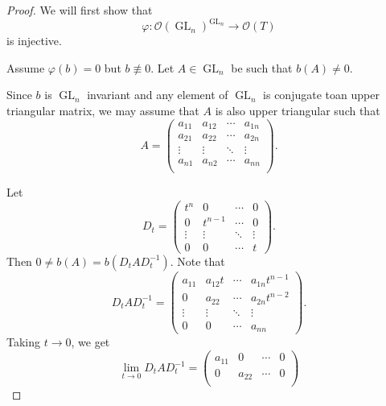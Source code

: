 \documentclass[10pt]{article}
\numberwithin{equation}{theorem}
\DeclareMathOperator{\GL}{GL}
\newcommand{\Ouv}[0]{\mathcal{O}}
\begin{document}
\begin{proof}
  We will first show that 
  \begin{equation*}
    \varphi:\Ouv(\GL_n)^{\GL_n}\to\Ouv(T)
  \end{equation*}
  is injective. 
  \par Assume $\varphi(b) = 0$ but $b\not\equiv0$. Let $A\in\GL_n$ be such that $b(A) \not = 0$. 
  \par Since $b$ is $\GL_n$ invariant and any element of $\GL_n$ is conjugate toan upper triangular matrix, we may assume that $A$ is also upper triangular such that 
  \begin{equation*}
    A = \begin{pmatrix}
      a_{11} & a_{12} & \cdots & a_{1n}\\
      a_{21} & a_{22} & \cdots & a_{2n}\\
      \vdots & \vdots & \ddots & \vdots\\
      a_{n1} & a_{n2} & \cdots & a_{nn}\\
    \end{pmatrix}.
  \end{equation*}
  \par Let 
  \begin{equation*}
    D_t = \begin{pmatrix}
      t^n & 0& \cdots & 0 \\
      0 & t^{n-1}& \cdots &0\\
      \vdots & \vdots & \ddots & \vdots\\
      0 & 0 & \cdots & t
    \end{pmatrix}.
  \end{equation*} 
  Then $0\not=b(A) = b(D_tAD_t^{-1})$. Note that 
  \begin{equation*}
    D_t A D_t^{-1} = 
    \begin{pmatrix}
      a_{11} & a_{12}t & \cdots & a_{1n}t^{n-1}\\
      0 & a_{22} & \cdots & a_{2n}t^{n-2}\\
      \vdots & \vdots & \ddots & \vdots\\
      0 & 0 & \cdots & a_{nn}
    \end{pmatrix}.
  \end{equation*}
  Taking $t\to 0$, we get 
  \begin{equation*}
    \lim_{t\to 0}D_tAD_t^{-1} = \begin{pmatrix}
      a_{11} & 0&\cdots& 0 \\
      0 & a_{22} & \cdots& 0 \\

\end{pmatrix}
\end{equation*}
\end{proof}
\end{document}
